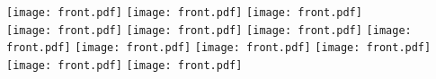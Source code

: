 \documentclass{article}
\begin{document}
 \noindent\texttt{[image: front.pdf]}
 \hspace{10mm}
 \texttt{[image: front.pdf]}
 \hspace{10mm}
 \texttt{[image: front.pdf]} \\
 \texttt{[image: front.pdf]}
 \hspace{10mm}
 \texttt{[image: front.pdf]}
 \hspace{10mm}
 \texttt{[image: front.pdf]}
 \texttt{[image: front.pdf]}
 \hspace{10mm}
 \texttt{[image: front.pdf]}
 \hspace{10mm}
 \texttt{[image: front.pdf]}
 \texttt{[image: front.pdf]}
 \hspace{10mm}
 \texttt{[image: front.pdf]}
 \hspace{10mm}
 \texttt{[image: front.pdf]}
\end{document}
